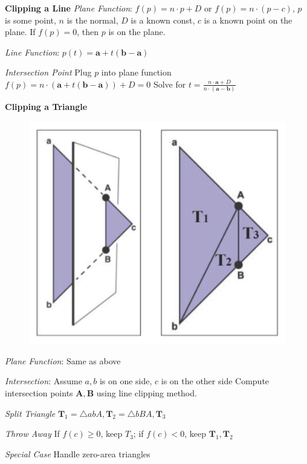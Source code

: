 \documentclass[letterpaper, 8pt]{extarticle}
\begin{document}
\begin{multicols*}{4}
\textbf{Clipping a Line}
\textit{Plane Function}:
\(f(p) = n \cdot p + D\) or \(f(p) = n \cdot (p - c)\), \(p\) is some point,
\(n\) is the normal, \(D\) is a known const, $c$ is a known point on the plane. If $f(p) = 0$, then $p$ is on the plane.

\textit{Line Function}:
\(p(t) = \mathbf{a} + t (\mathbf{b} - \mathbf{a})\)

\textit{Intersection Point}
Plug \(p\) into plane function \(f(p) = n \cdot (\mathbf{a} + t(\mathbf{b} - \mathbf{a})) + D = 0\)
Solve for \(t = \frac{n \cdot \textbf{a} + D}{n \cdot (\textbf{a} - \textbf{b})}\)

\textbf{Clipping a Triangle}
\begin{figure}[!ht]
    \includegraphics[width=\linewidth]{triangle-clipping.png}
\end{figure}

\textit{Plane Function}:
Same as above

\textit{Intersection}:
Assume \(a, b\) is on one side, \(c\) is on the other side
Compute intersection points \(\mathbf{A}, \mathbf{B}\) using line clipping method.

\textit{Split Triangle}
\(\mathbf{T}_1=\triangle abA, \mathbf{T}_2=\triangle bBA, \mathbf{T}_3\)

\textit{Throw Away}
If \(f(c) \geq 0\), keep \(T_3\); if \(f(c) < 0\), keep \(\mathbf{T}_1, \mathbf{T}_2\)

\textit{Special Case}
Handle zero-area triangles


\end{multicols*}
\end{document}
